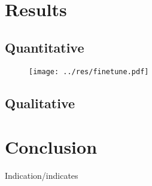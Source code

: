 \documentclass{article}
\begin{document}
\section{Results}
\subsection{Quantitative}
\begin{figure}
\texttt{[image: ../res/finetune.pdf]}
\end{figure}

\subsection{Qualitative}

\section{Conclusion}
Indication/indicates

\printbibliography
\end{document}
